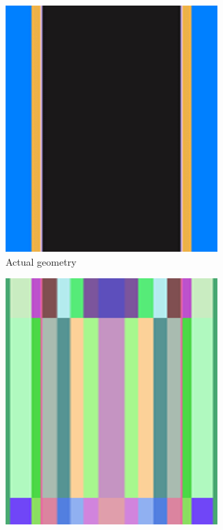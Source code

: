 \begin{figure}[h]
    \centering
    \begin{subfigure}[b]{0.25\textwidth}
        \centering
        \includegraphics[width=\textwidth]{figs/sec_1a.png}
        \caption{Actual geometry}
        \label{fig_1a}
    \end{subfigure}
    \hspace{6em}
    \begin{subfigure}[b]{0.25\textwidth}
        \centering
        \includegraphics[width=\textwidth]{figs/sec_1b.png}

\end{subfigure}
\end{figure}
